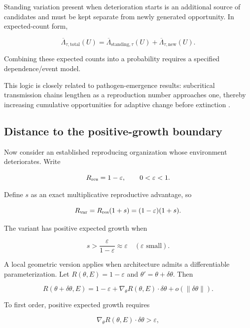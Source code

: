 \documentclass[11pt,a4paper]{article}
\begin{document}
Standing variation present when deterioration starts is an additional source of candidates and must be kept separate from newly generated opportunity. In expected-count form,

\begin{equation}
\overline\Lambda_{\tau,\mathrm{total}}(U)
=
\overline\Lambda_{\mathrm{standing},\tau}(U)
+
\overline\Lambda_{\tau,\mathrm{new}}(U).
\label{eq:standing-plus-new}
\end{equation}

Combining these expected counts into a probability requires a specified dependence/event model.

This logic is closely related to pathogen-emergence results: subcritical transmission chains lengthen as a reproduction number approaches one, thereby increasing cumulative opportunities for adaptive change before extinction \citep{Antia2003,Woolhouse2005}.

\subsection{Distance to the positive-growth boundary}

Now consider an established reproducing organization whose environment deteriorates. Write

\[
R_{\rm res}=1-\varepsilon,
\qquad0<\varepsilon<1.
\]

Define $s$ as an exact multiplicative reproductive advantage, so

\[
R_{\rm var}=R_{\rm res}(1+s)=(1-\varepsilon)(1+s).
\]

The variant has positive expected growth when

\begin{equation}
s>\frac{\varepsilon}{1-\varepsilon}\approx\varepsilon
\quad(\varepsilon\text{ small}).
\label{eq:rescue-step}
\end{equation}

A local geometric version applies when architecture admits a differentiable parameterization. Let $R(\theta,E)=1-\varepsilon$ and $\theta'=\theta+\delta\theta$. Then

\[
R(\theta+\delta\theta,E)
=
1-\varepsilon+\nabla_\theta R(\theta,E)\cdot\delta\theta+o(\|\delta\theta\|).
\]

To first order, positive expected growth requires

\begin{equation}
\nabla_\theta R(\theta,E)\cdot\delta\theta>\varepsilon,
\label{eq:gradient-rescue}
\end{equation}
\end{document}
